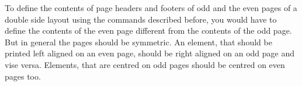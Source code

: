 \begin{Declaration}
                \\
                \\
                \\
                \\
                \\
\end{Declaration}
%
%
%
%
%
%
To define the contents of page headers and footers of odd and the even pages
of a double side layout using the commands described before, you would have to
define the contents of the even page different from the contents of the odd
page. But in general the pages should be symmetric. An element, that should be
printed left aligned on an even page, should be right aligned on an odd page
and vise versa. Elements, that are centred on odd pages should be centred on
even pages too.

